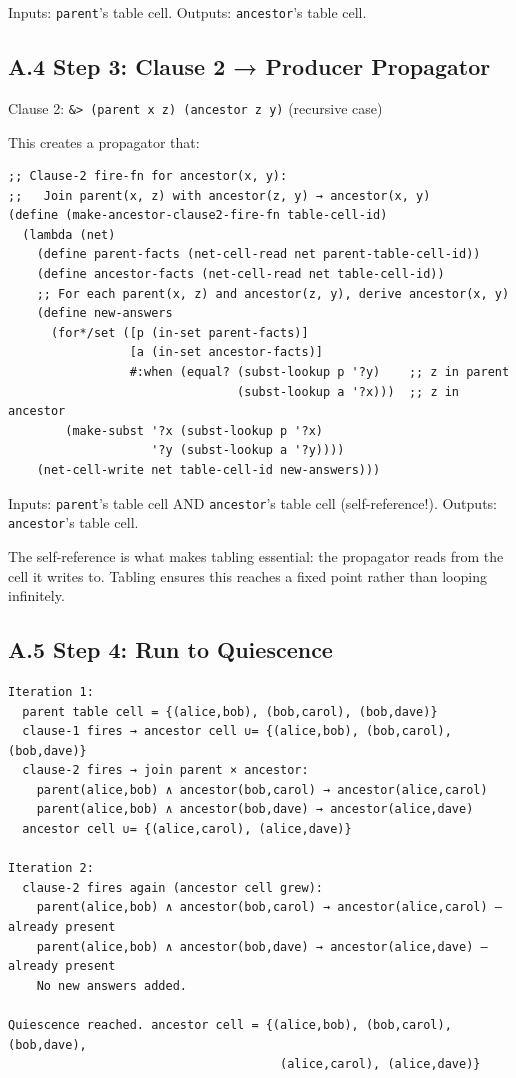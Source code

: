 \documentclass[11pt]{article}
\begin{document}
Inputs: \texttt{parent}'s table cell.
Outputs: \texttt{ancestor}'s table cell.
\subsection{A.4 Step 3: Clause 2 → Producer Propagator}
\label{sec:org830e4c1}

Clause 2: \texttt{\&> (parent x z) (ancestor z y)} (recursive case)

This creates a propagator that:

\begin{verbatim}
;; Clause-2 fire-fn for ancestor(x, y):
;;   Join parent(x, z) with ancestor(z, y) → ancestor(x, y)
(define (make-ancestor-clause2-fire-fn table-cell-id)
  (lambda (net)
    (define parent-facts (net-cell-read net parent-table-cell-id))
    (define ancestor-facts (net-cell-read net table-cell-id))
    ;; For each parent(x, z) and ancestor(z, y), derive ancestor(x, y)
    (define new-answers
      (for*/set ([p (in-set parent-facts)]
                 [a (in-set ancestor-facts)]
                 #:when (equal? (subst-lookup p '?y)    ;; z in parent
                                (subst-lookup a '?x)))  ;; z in ancestor
        (make-subst '?x (subst-lookup p '?x)
                    '?y (subst-lookup a '?y))))
    (net-cell-write net table-cell-id new-answers)))
\end{verbatim}

Inputs: \texttt{parent}'s table cell AND \texttt{ancestor}'s table cell (self-reference!).
Outputs: \texttt{ancestor}'s table cell.

The self-reference is what makes tabling essential: the propagator reads from
the cell it writes to. Tabling ensures this reaches a fixed point rather
than looping infinitely.
\subsection{A.5 Step 4: Run to Quiescence}
\label{sec:org724357c}

\begin{verbatim}
Iteration 1:
  parent table cell = {(alice,bob), (bob,carol), (bob,dave)}
  clause-1 fires → ancestor cell ∪= {(alice,bob), (bob,carol), (bob,dave)}
  clause-2 fires → join parent × ancestor:
    parent(alice,bob) ∧ ancestor(bob,carol) → ancestor(alice,carol)
    parent(alice,bob) ∧ ancestor(bob,dave) → ancestor(alice,dave)
  ancestor cell ∪= {(alice,carol), (alice,dave)}

Iteration 2:
  clause-2 fires again (ancestor cell grew):
    parent(alice,bob) ∧ ancestor(bob,carol) → ancestor(alice,carol) — already present
    parent(alice,bob) ∧ ancestor(bob,dave) → ancestor(alice,dave) — already present
    No new answers added.

Quiescence reached. ancestor cell = {(alice,bob), (bob,carol), (bob,dave),
                                      (alice,carol), (alice,dave)}
\end{verbatim}
\end{document}
